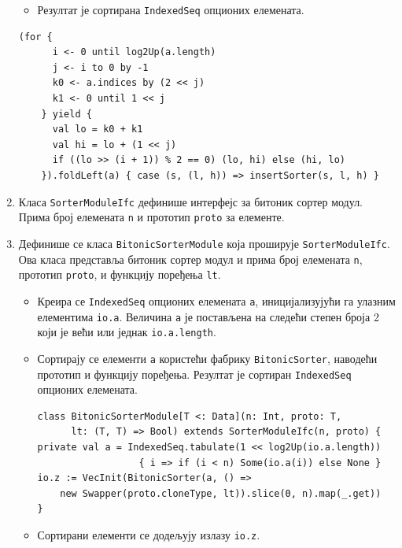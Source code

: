 \documentclass[12pt, a4paper]{article}
\theoremstyle{definition}
\begin{document}
\begin{enumerate}
\begin{itemize}
\item Резултат је сортирана \verb+IndexedSeq+ опционих елемената.
\end{itemize}

\begin{verbatim}
(for {
      i <- 0 until log2Up(a.length)
      j <- i to 0 by -1
      k0 <- a.indices by (2 << j)
      k1 <- 0 until 1 << j
    } yield {
      val lo = k0 + k1
      val hi = lo + (1 << j)
      if ((lo >> (i + 1)) % 2 == 0) (lo, hi) else (hi, lo)
    }).foldLeft(a) { case (s, (l, h)) => insertSorter(s, l, h) }
\end{verbatim}


\item Класа \verb+SorterModuleIfc+ дефинише интерфејс за битоник сортер модул. Прима број елемената \verb+n+ и прототип \verb+proto+ за елементе.

\item Дефинише се класа \verb+BitonicSorterModule+ која проширује \verb+SorterModuleIfc+. Ова класа представља битоник сортер модул и прима број елемената \verb+n+, прототип \verb+proto+, и функцију поређења \verb+lt+.

\begin{itemize}
\item Креира се \verb+IndexedSeq+ опционих елемената \verb+a+, иницијализујући га улазним елементима \verb+io.a+. Величина \verb+a+ је постављена на следећи степен броја 2 који је већи или једнак \verb+io.a.length+.

\item Сортирају се елементи \verb+a+ користећи фабрику \verb+BitonicSorter+, наводећи прототип и функцију поређења. Резултат је сортиран \verb+IndexedSeq+ опционих елемената.

\begin{verbatim}
class BitonicSorterModule[T <: Data](n: Int, proto: T,
      lt: (T, T) => Bool) extends SorterModuleIfc(n, proto) {
private val a = IndexedSeq.tabulate(1 << log2Up(io.a.length))
                  { i => if (i < n) Some(io.a(i)) else None }
io.z := VecInit(BitonicSorter(a, () =>
    new Swapper(proto.cloneType, lt)).slice(0, n).map(_.get))
}
\end{verbatim}

\item Сортирани елементи се додељују излазу \verb+io.z+.
\end{itemize}



\end{enumerate}
\end{document}
